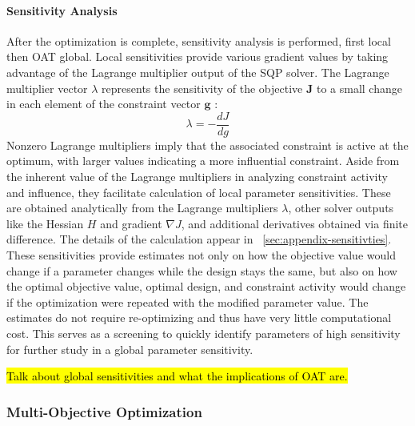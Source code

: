 \paragraph{Sensitivity Analysis}
After the optimization is complete, sensitivity analysis is performed, first local then OAT global.
Local sensitivities provide various gradient values by taking advantage of the Lagrange multiplier output of the SQP solver.
The Lagrange multiplier vector $\lambda$ represents the sensitivity of the objective $\textbf{J}$ to a small change in each element of the constraint vector $\textbf{g}$ \cite{martins_engineering_2022}:
\begin{equation}
    \lambda = -\frac{dJ}{dg} %
\end{equation}
Nonzero Lagrange multipliers imply that the associated constraint is active at the optimum, with larger values indicating a more influential constraint.
Aside from the inherent value of the Lagrange multipliers in analyzing constraint activity and influence, they facilitate calculation of local parameter sensitivities.
These are obtained analytically from the Lagrange multipliers $\lambda$, other solver outputs like the Hessian $H$ and gradient $\nabla  J$, and additional derivatives obtained via finite difference.
The details of the calculation appear in \appendixname~\ref{sec:appendix-sensitivties}.
These sensitivities provide estimates not only on how the objective value would change if a parameter changes while the design stays the same, but also on how the optimal objective value, optimal design, and constraint activity would change if the optimization were repeated with the modified parameter value.
The estimates do not require re-optimizing and thus have very little computational cost.
This serves as a screening to quickly identify parameters of high sensitivity for further study in a global parameter sensitivity. 


\hl{Talk about global sensitivities and what the implications of OAT are.} 

\subsubsection{Multi-Objective Optimization}\label{sec:multi-obj-process}
